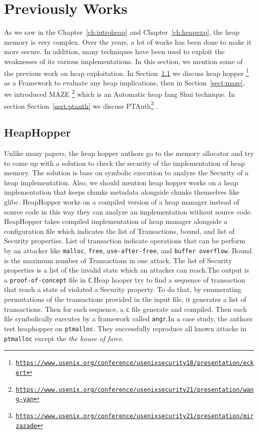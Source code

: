 \documentclass{masterthesis}
\newcommand*\libc{glibc}
\newcommand{\refToChapter}[1]{Chapter~\ref{ch:#1}\xspace}
\newcommand{\refToSection}[1]{Section~\ref{sect:#1}\xspace}
\begin{document}
\chapter{Previously Works}
As we saw in the \refToChapter{introheap} and \refToChapter{heapexp}, the heap memory is very complex. Over the years, a lot of works has been done to make it more secure. In addition, many techniques have been used to exploit the weaknesses of its various implementations. In this section, we mention some of the previous work on heap exploitation. In \refToSection{heaphopper} we discuss heap hopper \footnote{\href{https://www.usenix.org/conference/usenixsecurity18/presentation/eckert}{\texttt{https://www.usenix.org/conference/usenixsecurity18/presentation/eckert}}}  as a Framework to evaluate any heap implications, then in \refToSection{maze}, we introduced MAZE  \footnote{\href{https://www.usenix.org/conference/usenixsecurity21/presentation/wang-yan}{\texttt{https://www.usenix.org/conference/usenixsecurity21/presentation/wang-yan}}}  which is an Automatic heap fang Shui technique. In section \refToSection{ptauth} we discuss PTAuth\footnote{\href{https://www.usenix.org/conference/usenixsecurity21/presentation/mirzazade}{\texttt{https://www.usenix.org/conference/usenixsecurity21/presentation/mirzazade}}} .

\section{HeapHopper}
\label{sect:heaphopper}
Unlike many papers, the heap hopper authors go to the memory allocator and try to come up with a solution to check the security of the implementation of heap memory. The solution is base on symbolic execution to analyze the Security of a heap implementation. Also, we should mention heap hopper works on a heap implementation that keeps chunks metadata alongside chunks themselves like \libc{}. HeapHopper works on a compiled version of a heap manager instead of source code in this way they can analyze an implementation without source code. HeapHopper takes compiled implementation of heap manager alongside a configuration file which indicates the list of Transactions, bound, and list of Security properties. List of transaction indicate operations that can be perform by an attacker like \lstinline{malloc}, \lstinline{free}, \lstinline{use-after-free}, and \lstinline{buffer overflow}. Bound is the maximum number of Transactions in one attack. The list of Security properties is a list of the invalid state which an attacker can reach.The output is a \lstinline{proof-of-concept} file in \lstinline{C}.Heap hooper try to find a sequence of transaction that reach a state of violated a Security property. To do that, by enumerating permutations of the transactions provided in the input file, it generates a list of transactions. Then for each sequence, a \lstinline{c} file generate and compiled. Then each file symbolically executes by a framework called \lstinline{angr}.In a case study, the authors test heaphopper on \lstinline{ptmalloc}. They successfully reproduce all known attacks in \lstinline{ptmalloc} except the \emph{the house of force}.
\end{document}
